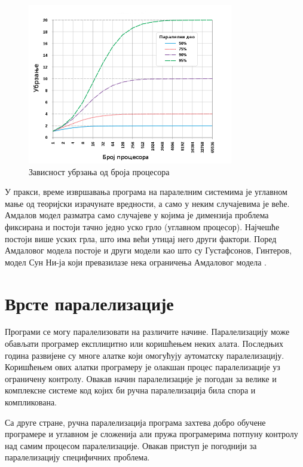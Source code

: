 \documentclass[12pt,oneside]{memoir}
\begin{document}
 \begin{figure}[!ht]
  \centering
  \includegraphics[width=0.8\textwidth]{img/amdal.png}
  \caption{Зависност убрзања од броја процесора}
  \label{fig:amdal}
\end{figure}



 У пракси, време извршавања програма на паралелним системима је углавном мање од теоријски израчунате вредности, а само у неким случајевима је веће. Амдалов модел разматра само случајеве у којима је димензија проблема фиксирана и постоји тачно једно уско грло (углавном процесор). Најчешће постоји више уских грла, што има већи утицај него други фактори. Поред Амдаловог модела постоје и други модели као што су Густафсонов, Гинтеров, модел Сун Ни-ја који превазилазе нека ограничења Амдаловог модела \cite{performance}.


  \section{Врсте паралелизације}
  
 Програми се могу паралелизовати на различите начине. Паралелизацију може обављати програмер експлицитно или коришћењем неких алата. Последњих година развијене су многе алатке који омогућују аутоматску паралелизацију. Коришћењем ових алатки програмеру је олакшан процес паралелизације уз ограничену контролу. Овакав начин паралелизације је погодан за велике и комплексне системе код којих би ручна паралелизација била спора и компликована.
 
  Са друге стране, ручна паралелизација програма захтева добро обучене програмере и углавном је сложенија али пружа програмерима потпуну контролу над самим процесом паралелизације. Овакав приступ је погоднији за паралелизацију специфичних проблема.
\end{document}

